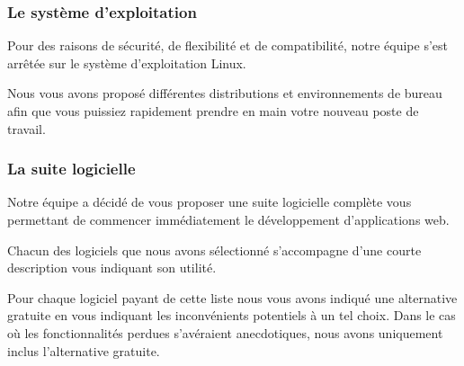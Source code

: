 \subsubsection{Le système d'exploitation}

Pour des raisons de sécurité, de flexibilité et de compatibilité, notre équipe s’est arrêtée sur le système d’exploitation Linux. 

Nous vous avons proposé différentes distributions et environnements de bureau afin que vous puissiez rapidement prendre en main votre nouveau poste de travail.

\subsubsection{La suite logicielle}

Notre équipe a décidé de vous proposer une suite logicielle complète vous permettant de commencer immédiatement le développement d’applications web.

Chacun des logiciels que nous avons sélectionné s’accompagne d’une courte description vous indiquant son utilité.

Pour chaque logiciel payant de cette liste nous vous avons indiqué une alternative gratuite en vous indiquant les inconvénients potentiels à un tel choix. Dans le cas où les fonctionnalités perdues s'avéraient anecdotiques, nous avons uniquement inclus l’alternative gratuite.
